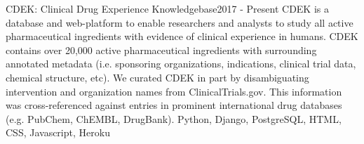 %
%
%


\begin{projects}
	\project
	{CDEK: Clinical Drug Experience Knowledgebase}{2017 - Present}
	{  }
	{CDEK is a database and web-platform to enable researchers and analysts to study all active pharmaceutical ingredients with evidence of clinical experience in humans. CDEK contains over 20,000 active pharmaceutical ingredients with surrounding annotated metadata (i.e. sponsoring organizations, indications, clinical trial data, chemical structure, etc). We curated CDEK in part by disambiguating intervention and organization names from ClinicalTrials.gov. This information was cross-referenced against entries in prominent international drug databases (e.g. PubChem, ChEMBL, DrugBank).}
	{Python, Django, PostgreSQL, HTML, CSS, Javascript, Heroku}
				

\end{projects}